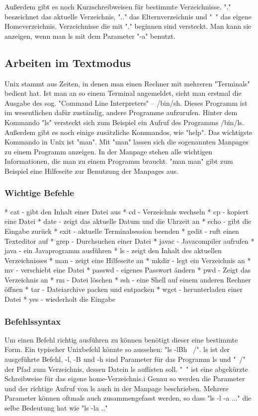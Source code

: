 Außerdem gibt es noch Kurzschreibweisen für bestimmte Verzeichnisse. "." beszeichnet das aktuelle Verzeichnis, ".." das Elternverzeichnis und "~" das eigene Homeverzeichnis.
Verzeichnisse die mit "." beginnen sind versteckt. Man kann sie anzeigen, wenn man ls mit dem Parameter "-a" benutzt.

\subsection {Arbeiten im Textmodus}
Unix stammt aus Zeiten, in denen man einen Rechner mit mehreren "Terminals" bedient hat. Ist man an so einem Terminal angemeldet, sieht man erstmal die Ausgabe des sog. "Command Line Interpreters" – /bin/sh. Dieses Programm ist im wesentlichen dafür zuständig, andere Programme aufzurufen. Hinter dem Kommando "ls" versteckt sich zum Beispiel ein Aufruf des Programms /bin/ls. Außerdem gibt es noch einige zusätzliche Kommandos, wie "help". Das wichtigste Kommando in Unix ist "man". Mit "man" lassen sich die sogenannten Manpages zu einem Programm anzeigen. In der Manpage stehen alle wichtigen Informationen, die man zu einem Programm braucht.
"man man" gibt zum Beispiel eine Hilfeseite zur Benutzung der Manpages aus.

\subsubsection {Wichtige Befehle}
* cat - gibt den Inhalt einer Datei aus
* cd - Verzeichnis wechseln
* cp - kopiert eine Datei
* date - zeigt das aktuelle Datum und die Uhrzeit an
* echo - gibt die Eingabe zurück
* exit - aktuelle Terminalsession beenden
* gedit - ruft einen Texteditor auf
* grep - Durchsuchen einer Datei
* javac - Javacompiler aufrufen
* java - ein Javaprogramm ausführen
* ls - zeigt den Inhalt des aktuellen Verzeichnisses
* man - zeigt eine Hilfeseite an
* mkdir - legt ein Verzeichnis an
* mv - verschiebt eine Datei
* passwd - eigenes Passwort ändern
* pwd - Zeigt das Verzeichnis an
* rm - Datei löschen
* ssh - eine Shell auf einem anderen Rechner öffnen
* tar - Dateiarchive packen und entpacken
* wget - herunterladen einer Datei
* yes - wiederholt die Eingabe

\subsubsection {Befehlssyntax}
Um einen Befehl richtig ausführen zu können benötigt dieser eine bestimmte Form. Ein typischer Unixbefehl könnte so aussehen:
"ls -lBh ~/". ls ist der ausgeführte Befehl, -l, -B und -h sind Parameter für das Programm ls und "~/" der Pfad zum Verzeichnis, dessen Datein ls auflisten soll. "~" ist eine abgekürzte Schreibweise für das eigene home-Verzeichnis.i
Genau so werden die Parameter und der richtige Aufruf von ls auch in der Manpage beschrieben. Mehrere Parameter können oftmals auch zusammengefasst werden, so dass "ls -l -a ..." die selbe Bedeutung hat wie "ls -la .."

